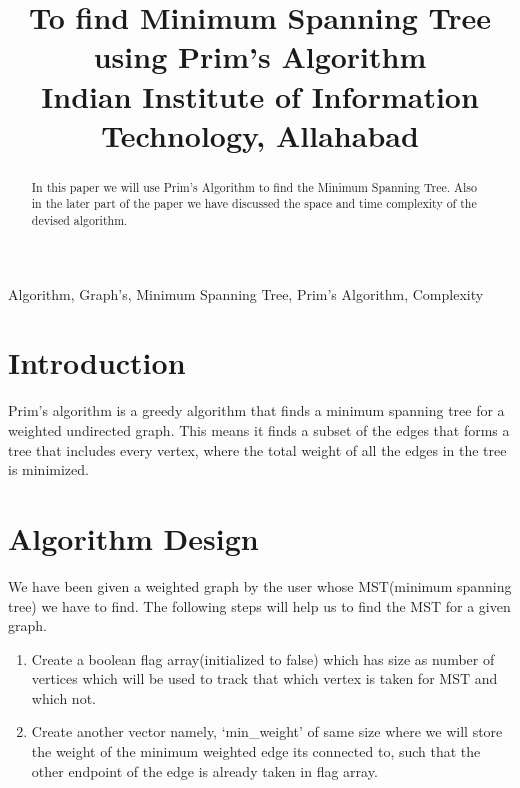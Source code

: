 \documentclass[conference]{IEEEtran}
\begin{document}
\title{To find Minimum Spanning Tree using Prim's Algorithm\\
{\footnotesize \textsuperscript {} Indian Institute of Information Technology, Allahabad}
}

\author{
\and
{}
\and
{}
}

\maketitle

\begin{abstract}
 In this paper we will use Prim's Algorithm to find the Minimum Spanning Tree. Also in the later part of the paper we have discussed the space and time complexity of the devised algorithm.
\end{abstract}

\begin{IEEEkeywords}
Algorithm, Graph's, Minimum Spanning Tree, Prim's Algorithm, Complexity
\end{IEEEkeywords}

\section{Introduction}
Prim's algorithm is a greedy algorithm that finds a minimum spanning tree for a weighted undirected graph. This means it finds a subset of the edges that forms a tree that includes every vertex, where the total weight of all the edges in the tree is minimized. 

\section{Algorithm Design}
We have been given a weighted graph by the user whose MST(minimum spanning tree) we have to find. The following steps will help us to find the MST for a given graph.
\begin{enumerate}
\item Create a boolean flag array(initialized to false) which has size as number of vertices which will be used to track that which vertex is taken for MST and which not.
\item Create another vector namely, ‘min\_weight’ of same size where we will store the weight of the minimum weighted edge its connected to, such that the other endpoint of the edge is already taken in flag array.
\end{enumerate}
\end{document}
